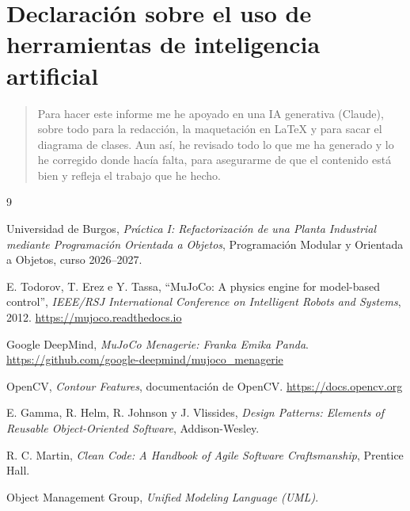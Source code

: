 \documentclass[12pt,a4paper]{article}
\renewcommand{\_}{\guionbajo\allowbreak}
\begin{document}
\clearpage
\section{Declaración sobre el uso de herramientas de inteligencia artificial}

\begin{quote}
Para hacer este informe me he apoyado en una IA generativa (Claude), sobre todo para la redacción, la maquetación en LaTeX y para sacar el diagrama de clases. Aun así, he revisado todo lo que me ha generado y lo he corregido donde hacía falta, para asegurarme de que el contenido está bien y refleja el trabajo que he hecho.
\end{quote}


\begin{thebibliography}{9}

Universidad de Burgos,
\textit{Práctica I: Refactorización de una Planta Industrial mediante Programación
Orientada a Objetos}, Programación Modular y Orientada a Objetos, curso 2026--2027.

E. Todorov, T. Erez e Y. Tassa,
``MuJoCo: A physics engine for model-based control'',
\textit{IEEE/RSJ International Conference on Intelligent Robots and Systems}, 2012.
\url{https://mujoco.readthedocs.io}

Google DeepMind,
\textit{MuJoCo Menagerie: Franka Emika Panda}.
\url{https://github.com/google-deepmind/mujoco_menagerie}

OpenCV,
\textit{Contour Features}, documentación de OpenCV.
\url{https://docs.opencv.org}

E. Gamma, R. Helm, R. Johnson y J. Vlissides,
\textit{Design Patterns: Elements of Reusable Object-Oriented Software},
Addison-Wesley.

R. C. Martin,
\textit{Clean Code: A Handbook of Agile Software Craftsmanship},
Prentice Hall.

Object Management Group,
\textit{Unified Modeling Language (UML)}.

\end{thebibliography}
\end{document}
